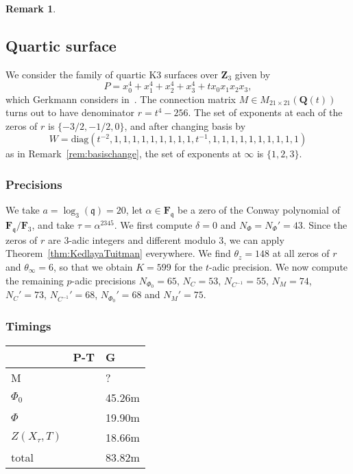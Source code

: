 \documentclass[a4paper,11pt]{article}
\numberwithin{equation}{section}
\newcommand{\ZZ}{\mathbf{Z}} %
\newcommand{\QQ}{\mathbf{Q}} %
\newcommand{\FF}{\mathbf{F}} %
\theoremstyle{definition}
\newtheorem{rem}[thm]{Remark}
\begin{document}
\begin{rem}
\end{rem}

\subsection{Quartic surface}

We consider the family of quartic K3 surfaces over $\ZZ_3$ given by
\begin{equation*}
P=x_0^4 + x_1^4 + x_2^4 + x_3^4 + t x_0 x_1 x_2 x_3,
\end{equation*}
which Gerkmann considers in~\citep[\S 7.5]{Gerkmann2007}. The connection matrix 
$M \in M_{21 \times 21}(\QQ(t))$ turns out to have denominator 
$r=t^4-256$. The set of exponents at each of the zeros of $r$ is $\{-3/2,-1/2,0\}$, 
and after changing basis by
\[
W=\mbox{diag}(t^{-2},1,1,1,1,1,1,1,1,1,t^{-1},1,1,1,1,1,1,1,1,1,1)
\] 
as in Remark~\ref{rem:basischange}, the set of exponents  at $\infty$ is 
$\{1,2,3\}$. 

\subsubsection{Precisions}

We take $a=\log_3(\mathfrak{q})=20$, let $\alpha \in \FF_{\mathfrak{q}}$
be a zero of the Conway polynomial of $\FF_{\mathfrak{q}}/\FF_{3}$, and take
$\tau=\alpha^{2345}$.  We first compute $\delta=0$ and $N_{\Phi}=N_{\Phi}'=43$.  
Since the zeros of $r$ are $3$-adic integers and different modulo $3$, we can apply 
Theorem~\ref{thm:KedlayaTuitman} everywhere. We find $\theta_z=148$ at all zeros 
of $r$ and $\theta_{\infty}=6$, so that we
obtain $K=599$ for the $t$-adic precision. We now compute the remaining $p$-adic 
precisions $N_{\Phi_0}=65$, $N_C=53$, $N_{C^{-1}}=55$, $N_M=74$, 
$N_C'=73$, $N_{C^{-1}}'=68$, $N_{\Phi_0}'=68$ and $N_M'=75$.

\subsubsection{Timings}

\begin{tabular}{l|l|l}
                 & \mbox{P-T} & \mbox{G}          \\
\hline                 
M                &              &  ?              \\
\hline                 
$\Phi_0$         &              & 45.26m          \\
\hline                 
$\Phi$           &              & 19.90m          \\
\hline
$Z(X_{\tau},T)$  &              & 18.66m          \\
\hline
total            &              & 83.82m          \\
\end{tabular}
\end{document}
